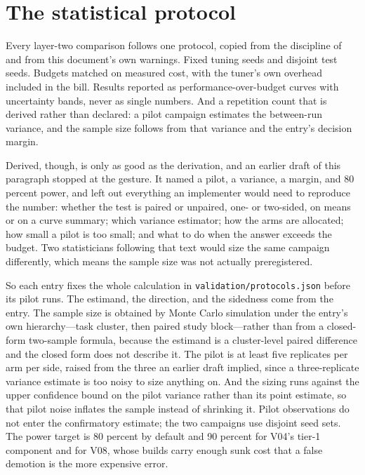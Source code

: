 \section{The statistical protocol}
\label{sec:val-protocol}

Every layer-two comparison follows one protocol, copied from the
discipline of \citet{eimer2023hyperparameters} and from this
document's own warnings. Fixed tuning seeds and disjoint test seeds.
Budgets matched on measured cost, with the tuner's own overhead
included in the bill. Results reported as performance-over-budget
curves with uncertainty bands, never as single numbers. And a
repetition count that is derived rather than declared: a pilot
campaign estimates the between-run variance, and the sample size
follows from that variance and the entry's decision margin.

Derived, though, is only as good as the derivation, and an earlier draft
of this paragraph stopped at the gesture. It named a pilot, a variance,
a margin, and 80 percent power, and left out everything an implementer
would need to reproduce the number: whether the test is paired or
unpaired, one- or two-sided, on means or on a curve summary; which
variance estimator; how the arms are allocated; how small a pilot is too
small; and what to do when the answer exceeds the budget. Two
statisticians following that text would size the same campaign
differently, which means the sample size was not actually preregistered.

So each entry fixes the whole calculation in
\texttt{validation/protocols.json} before its pilot runs. The estimand,
the direction, and the sidedness come from the entry. The sample size is
obtained by Monte Carlo simulation under the entry's own hierarchy—task
cluster, then paired study block—rather than from a closed-form
two-sample formula, because the estimand is a cluster-level paired
difference and the closed form does not describe it. The pilot is at
least five replicates per arm per side, raised from the three an earlier
draft implied, since a three-replicate variance estimate is too noisy to
size anything on. And the sizing runs against the upper confidence bound
on the pilot variance rather than its point estimate, so that pilot noise
inflates the sample instead of shrinking it. Pilot observations do not
enter the confirmatory estimate; the two campaigns use disjoint seed
sets. The power target is 80 percent by default and 90 percent for V04's
tier-1 component and for V08, whose builds carry enough sunk cost that a
false demotion is the more expensive error.

